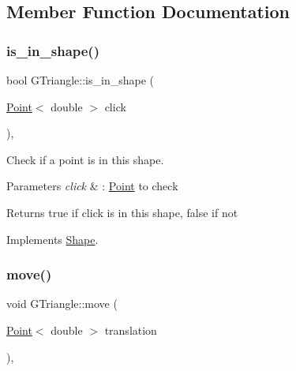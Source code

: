 \subsection{Member Function Documentation}
\mbox{\label{classGTriangle_a7e5d4eefbb2e42b9c3142096a23dcb19}} 
\subsubsection{\texorpdfstring{is\+\_\+in\+\_\+shape()}{is\_in\_shape()}}
{\footnotesize\ttfamily bool G\+Triangle\+::is\+\_\+in\+\_\+shape (\begin{DoxyParamCaption}\item[{\hyperlink{classPoint}{Point}$<$ double $>$}]{click }\end{DoxyParamCaption})\hspace{0.3cm}{\ttfamily [override]}, {\ttfamily [virtual]}}



Check if a point is in this shape. 


\begin{DoxyParams}{Parameters}
{\em click} & \+: \hyperlink{classPoint}{Point} to check \\
\hline
\end{DoxyParams}
\begin{DoxyReturn}{Returns}
true if click is in this shape, false if not 
\end{DoxyReturn}


Implements \hyperlink{classShape_abcce23128cd35989468a88a7194152af}{Shape}.

\mbox{\label{classGTriangle_a89910a7f176743473d3bfd15de01377d}} 
\subsubsection{\texorpdfstring{move()}{move()}}
{\footnotesize\ttfamily void G\+Triangle\+::move (\begin{DoxyParamCaption}\item[{\hyperlink{classPoint}{Point}$<$ double $>$}]{translation }\end{DoxyParamCaption})\hspace{0.3cm}{\ttfamily [override]}, {\ttfamily [virtual]}}



